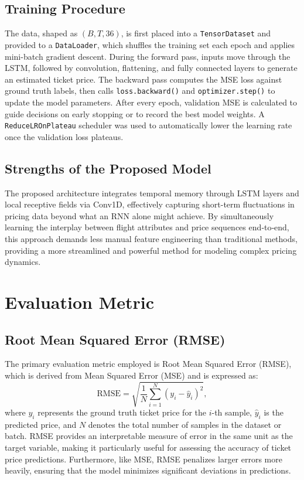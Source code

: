 \documentclass[conference]{IEEEtran}
\begin{document}
\subsection{Training Procedure}\label{5d}
The data, shaped as $(B, T, 36)$, is first placed into a \texttt{TensorDataset} and provided to a \texttt{DataLoader}, which shuffles the training set each epoch and applies mini-batch gradient descent. During the forward pass, inputs move through the LSTM, followed by convolution, flattening, and fully connected layers to generate an estimated ticket price. The backward pass computes the MSE loss against ground truth labels, then calls \texttt{loss.backward()} and \texttt{optimizer.step()} to update the model parameters. After every epoch, validation MSE is calculated to guide decisions on early stopping or to record the best model weights. A \texttt{ReduceLROnPlateau} scheduler was used to automatically lower the learning rate once the validation loss plateaus.

\subsection{Strengths of the Proposed Model}\label{5e}
The proposed architecture integrates temporal memory through LSTM layers and local receptive fields via Conv1D, effectively capturing short-term fluctuations in pricing data beyond what an RNN alone might achieve. By simultaneously learning the interplay between flight attributes and price sequences end‐to‐end, this approach demands less manual feature engineering than traditional methods, providing a more streamlined and powerful method for modeling complex pricing dynamics.


\section{Evaluation Metric}
\subsection{Root Mean Squared Error (RMSE)}\label{6a}
The primary evaluation metric employed is Root Mean Squared Error (RMSE), which is derived from Mean Squared Error (MSE) and is expressed as:
\[
\text{RMSE} = \sqrt{\frac{1}{N} \sum_{i=1}^N (y_i - \hat{y}_i)^2},
\]
where $y_i$ represents the ground truth ticket price for the $i$-th sample, $\hat{y}_i$ is the predicted price, and $N$ denotes the total number of samples in the dataset or batch. RMSE provides an interpretable measure of error in the same unit as the target variable, making it particularly useful for assessing the accuracy of ticket price predictions. Furthermore, like MSE, RMSE penalizes larger errors more heavily, ensuring that the model minimizes significant deviations in predictions.
\end{document}
